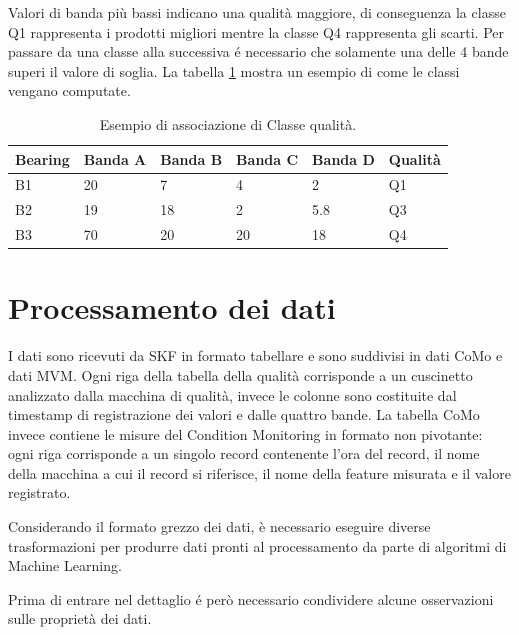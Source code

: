 Valori di banda più bassi indicano una qualità maggiore, di conseguenza la classe Q1 rappresenta i prodotti migliori mentre la classe Q4 rappresenta gli scarti. 
Per passare da una classe alla successiva é necessario che solamente una delle 4 bande superi il valore di soglia. 
La tabella \ref{mvm-esempio} mostra un esempio di come le classi vengano computate.

\begin{table}
	\caption{\label{mvm-esempio}Esempio di associazione di Classe qualità.}
	\centering
	\begin{tabular}{|l|l|l|l|l|l|}
		\hline
		Bearing & \multicolumn{1}{c|}{Banda A} & \multicolumn{1}{c|}{Banda B} & \multicolumn{1}{c|}{Banda C} & \multicolumn{1}{c|}{Banda D} & Qualità \\ \hline
		B1      & 20                           & 7                            & 4                            & 2                            & Q1      \\ \hline
		B2      & 19                           & 18                           & 2                            & 5.8                          & Q3      \\ \hline
		B3      & 70                           & 20                           & 20                           & 18                           & Q4      \\ \hline
	\end{tabular}
\end{table}

\section{Processamento dei dati}
I dati sono ricevuti da SKF in formato tabellare e sono suddivisi in dati CoMo e dati MVM. Ogni riga della tabella della qualità corrisponde a un cuscinetto analizzato dalla macchina di qualità, invece le colonne sono costituite dal timestamp di registrazione dei valori e dalle quattro bande.
La tabella CoMo invece contiene le misure del Condition Monitoring in formato non pivotante: ogni riga corrisponde a un singolo record contenente l'ora del record, il nome della macchina a cui il record si riferisce, il nome della feature misurata e il valore registrato.

Considerando il formato grezzo dei dati, è necessario eseguire diverse trasformazioni per produrre dati pronti al processamento da parte di algoritmi di Machine Learning. 

Prima di entrare nel dettaglio é però necessario condividere alcune osservazioni sulle proprietà dei dati.

